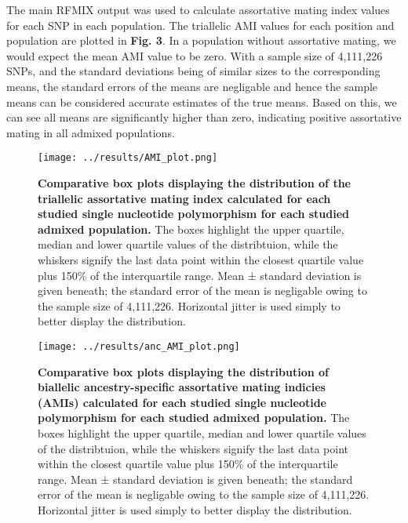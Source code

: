 \documentclass[11pt]{article}
\begin{document}
The main RFMIX output was used to calculate assortative mating index values for each SNP in each population. The triallelic AMI values for each position and population are plotted in \textbf{Fig. 3}. In a population without assortative mating, we would expect the mean AMI value to be zero. With a sample size of 4,111,226 SNPs, and the standard deviations being of similar sizes to the corresponding means, the standard errors of the means are negligable and hence the sample means can be considered accurate estimates of the true means. Based on this, we can see all means are significantly higher than zero, indicating positive assortative mating in all admixed populations.



\vspace{3mm}
\begin{figure}[htb!]%
    \centering
    \texttt{[image: ../results/AMI\_plot.png]} 
    \vspace{.1cm}
    \caption{\textbf{
        Comparative box plots displaying the distribution of the triallelic assortative mating index calculated for each studied single nucleotide polymorphism for each studied admixed population.
    }
        The boxes highlight the upper quartile, median and lower quartile values of the distribtuion, while the whiskers signify the last data point within the closest quartile value plus 150\% of the interquartile range. Mean ± standard deviation is given beneath; the standard error of the mean is negligable owing to the sample size of 4,111,226. Horizontal jitter is used simply to better display the distribution.
    }
\end{figure}




\begin{figure}[p]%
    \centering
    \texttt{[image: ../results/anc\_AMI\_plot.png]} 
    \vspace{.2cm}
    \caption{\textbf{
        Comparative box plots displaying the distribution of biallelic ancestry-specific assortative mating indicies (AMIs) calculated for each studied single nucleotide polymorphism for each studied admixed population.
    }
        The boxes highlight the upper quartile, median and lower quartile values of the distribtuion, while the whiskers signify the last data point within the closest quartile value plus 150\% of the interquartile range. Mean ± standard deviation is given beneath; the standard error of the mean is negligable owing to the sample size of 4,111,226. Horizontal jitter is used simply to better display the distribution.
    }
\end{figure}
\end{document}
